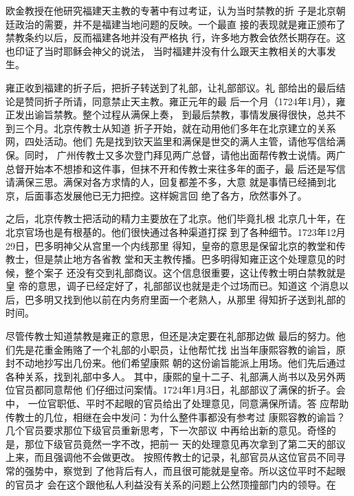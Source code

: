 欧金教授在他研究福建天主教的专著中有过考证，认为当时禁教的折%
子是北京朝廷政治的需要，并不是福建当地问题的反映。一个最直%
接的表现就是雍正颁布了禁教条约以后，反而福建各地并没有严格执%
行，许多地方教会依然长期存在。这也印证了当时耶稣会神父的说法，%
当时福建并没有什么跟天主教相关的大事发生。%
\par
雍正收到福建的折子后，把折子转送到了礼部，让礼部部议。礼%
部给出的最后结论是赞同折子所请，同意禁止天主教。雍正元年的最%
后一个月（1724年1月），雍正发出谕旨禁教。整个过程从满保上奏，%
到最后禁教，事情发展得很快，总共不到三个月。北京传教士从知道%
折子开始，就在动用他们多年在北京建立的关系网，四处活动。他们%
先是找到钦天监里和满保是世交的满人主管，请他写信给满保。同时，%
广州传教士又多次登门拜见两广总督，请他出面帮传教士说情。两广%
总督开始本不想掺和这件事，但抹不开和传教士来往多年的面子，最%
后还是写信请满保三思。满保对各方求情的人，回复都差不多，大意%
就是事情已经捅到北京，后面事态发展他已无力把控。这样婉言回%
绝了各方，欣然事外了。%
\par
之后，北京传教士把活动的精力主要放在了北京。他们毕竟扎根%
北京几十年，在北京官场也是有根基的。他们很快通过各种渠道打探%
到了各种细节。1723年12月29日，巴多明神父从宫里一个内线那里%
得知，皇帝的意思是保留北京的教堂和传教士，但是禁止地方各省教%
堂和天主教传播。巴多明得知雍正这个处理意见的时候，整个案子%
还没有交到礼部商议。这个信息很重要，这让传教士明白禁教就是皇%
帝的意思，调子已经定好了，礼部部议也就是走个过场而已。知道这%
个消息以后，巴多明又找到他以前在内务府里面一个老熟人，从那里%
得知折子送到礼部的时间。%
\par
尽管传教士知道禁教是雍正的意思，但还是决定要在礼部那边做%
最后的努力。他们先是花重金贿赂了一个礼部的小职员，让他帮忙找%
出当年康熙容教的谕旨，原封不动地抄写出几份来。他们希望康熙%
朝的这份谕旨能派上用场。他们先后通过各种关系，找到礼部中多人。%
其中，康熙的皇十二子、礼部满人尚书以及另外两位官员都同意帮他%
们仔细过问案情。1724年1月3日，礼部部议了满保的折子。会中，%
一位官职低、平时不起眼的官员给出了处理意见，同意满保所请。答%
应帮助传教士的几位，相继在会中发问：为什么整件事都没有参考过%
康熙容教的谕旨？几个官员要求那位下级官员重新思考，下一次部议%
中再给出新的意见。奇怪的是，那位下级官员竟然一字不改，把前一%
天的处理意见再次拿到了第二天的部议上来，而且强调他不会做更改。%
按照传教士的记录，礼部官员从这位官员不同寻常的强势中，察觉到%
了他背后有人，而且很可能就是皇帝。所以这位平时不起眼的官员才%
会在这个跟他私人利益没有关系的问题上公然顶撞部门内的领导。在%
